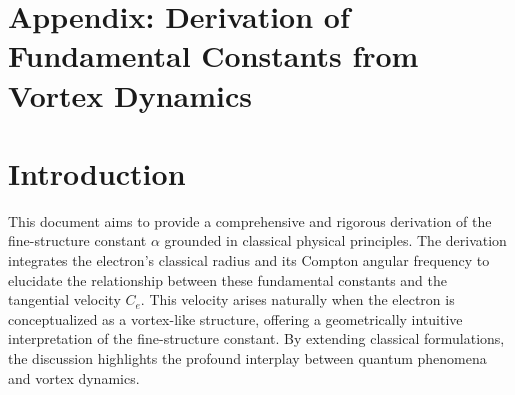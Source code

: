 
%
%
%
%
%
%
%
%
%
\section{\textbf{Appendix: Derivation of Fundamental Constants from Vortex Dynamics}}
\label{sec:appendix:1}

\section*{Introduction}
This document aims to provide a comprehensive and rigorous derivation of the fine-structure constant $\alpha$ grounded in classical physical principles.
The derivation integrates the electron's classical radius and its Compton angular frequency to elucidate the relationship between these fundamental constants and the tangential velocity $C_e$.
This velocity arises naturally when the electron is conceptualized as a vortex-like structure, offering a geometrically intuitive interpretation of the fine-structure constant.
By extending classical formulations, the discussion highlights the profound interplay between quantum phenomena and vortex dynamics.


